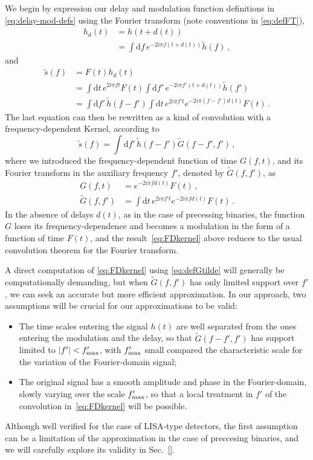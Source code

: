 \documentclass[aps,showpacs,twocolumn,
prd,superscriptaddress,nofootinbib]{revtex4-1}
\newcommand{\be}{\begin{equation}}
\newcommand{\ee}{\end{equation}}
\newcommand\ud{{\mathrm{d}}}
\newcommand{\nn}{\nonumber}
\newcommand{\jgb}[1]{{\color{DarkGreen} #1}}
\begin{document}
\jgb{We begin by expression our delay and modulation function definitions in \eqref{eq:delay-mod-defs} using the Fourier transform (note conventions in \eqref{eq:defFT})},
\begin{align}
h_{d}(t) & =  h(t+d(t)) \nonumber\\
&=\int \ud f \, e^{-2i\pi f (t+d(t))}\tilde{h}(f) \,,
\end{align}
and
\begin{align}
  \tilde{s}(f) &= F(t)h_{d}(t) \nn \\
  &= \int \ud t \, e^{2i\pi f t} F(t)  \int \ud f' \, e^{-2i\pi f' (t+d(t))}\tilde{h}(f') \nn\\
	&= \int \ud f' \, \tilde{h}(f-f') \int \ud t \, e^{2i\pi f' t} e^{-2i\pi (f-f') d(t)} F(t) \,.
\end{align}
The last equation can then be rewritten as a kind of convolution with a frequency-dependent Kernel, according to
\be\label{eq:FDkernel}
	\tilde{s}(f) = \int \ud f' \, \tilde{h}(f-f') \tilde{G}(f-f',f') \,,
\ee
where we introduced the frequency-dependent function of time $G(f,t)$, and its Fourier transform in the auxiliary frequency $f'$, denoted by $\tilde{G}(f,f')$, as
\begin{subequations}\label{eq:defg}
\begin{align}
	G(f,t) &= e^{-2i\pi f d(t)} F(t) \,, \\
	\tilde{G}(f,f') &= \int \ud t \, e^{2i\pi f' t} e^{-2i\pi f d(t)} F(t) \,.
\label{eq:defGtilde}
\end{align}
\end{subequations}
In the absence of delays $d(t)$, as in the case of precessing binaries, the function $G$ loses its frequency-dependence and becomes a modulation in the form of a function of time $F(t)$, and the result~\eqref{eq:FDkernel} above reduces to the usual convolution theorem for the Fourier transform.

\jgb{A direct computation of \eqref{eq:FDkernel} using \eqref{eq:defGtilde} will generally be computationally demanding, but when $\tilde{G}(f,f')$ has only limited support over $f'$, we can seek an accurate but more efficient approximation.} In our approach, two assumptions will be crucial for our approximations to be valid:
\begin{itemize}
	\item The time scales entering the signal $h(t)$ are well separated from the ones entering the modulation and the delay, so that $\tilde{G}(f-f',f')$ has support limited to $|f'| < f'_{\rm max}$, with $f'_{\rm max}$ small compared the characteristic scale for the variation of the Fourier-domain signal;
	\item The original signal has a smooth amplitude and phase in the Fourier-domain, slowly varying over the scale $f'_{\rm max}$, so that a local treatment in $f'$ of the convolution in~\eqref{eq:FDkernel} will be possible.
\end{itemize}
Although well verified for the case of LISA-type detectors, the first assumption can be a limitation of the approximation in the case of preccesing binaries, and we will carefully explore its validity in Sec.~\ref{}.
\end{document}
